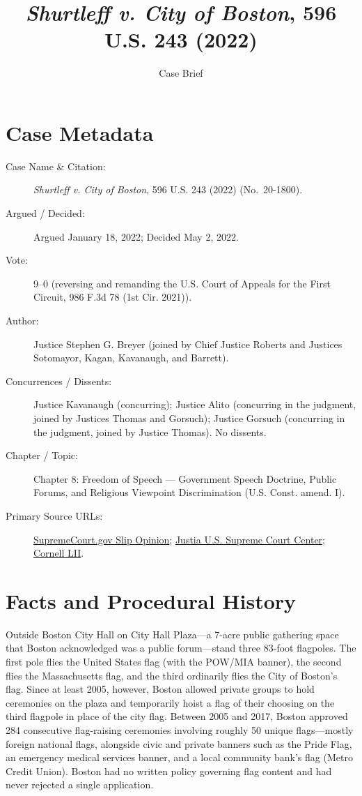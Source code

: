 \documentclass[12pt]{article}
\title{\textit{Shurtleff v. City of Boston}, 596 U.S. 243 (2022)}
\author{Case Brief}
\date{}
\begin{document}
\maketitle

\section{Case Metadata}
\begin{description}
  \item[Case Name \& Citation:] \textit{Shurtleff v. City of Boston}, 596 U.S. 243 (2022) (No.~20-1800).
  \item[Argued / Decided:] Argued January 18, 2022; Decided May 2, 2022.
  \item[Vote:] 9--0 (reversing and remanding the U.S. Court of Appeals for the First Circuit, 986 F.3d 78 (1st Cir. 2021)).
  \item[Author:] Justice Stephen G. Breyer (joined by Chief Justice Roberts and Justices Sotomayor, Kagan, Kavanaugh, and Barrett).
  \item[Concurrences / Dissents:] Justice Kavanaugh (concurring); Justice Alito (concurring in the judgment, joined by Justices Thomas and Gorsuch); Justice Gorsuch (concurring in the judgment, joined by Justice Thomas). No dissents.
  \item[Chapter / Topic:] Chapter 8: Freedom of Speech --- Government Speech Doctrine, Public Forums, and Religious Viewpoint Discrimination (U.S. Const. amend. I).
  \item[Primary Source URLs:] \href{https://www.supremecourt.gov/opinions/21pdf/20-1800_7lho.pdf}{SupremeCourt.gov Slip Opinion}; \href{https://supreme.justia.com/cases/federal/us/596/20-1800/}{Justia U.S. Supreme Court Center}; \href{https://www.law.cornell.edu/supremecourt/text/20-1800}{Cornell LII}.
\end{description}

\section{Facts and Procedural History}
Outside Boston City Hall on City Hall Plaza---a 7-acre public gathering space that Boston acknowledged was a public forum---stand three 83-foot flagpoles. The first pole flies the United States flag (with the POW/MIA banner), the second flies the Massachusetts flag, and the third ordinarily flies the City of Boston's flag. Since at least 2005, however, Boston allowed private groups to hold ceremonies on the plaza and temporarily hoist a flag of their choosing on the third flagpole in place of the city flag. Between 2005 and 2017, Boston approved 284 consecutive flag-raising ceremonies involving roughly 50 unique flags---mostly foreign national flags, alongside civic and private banners such as the Pride Flag, an emergency medical services banner, and a local community bank's flag (Metro Credit Union). Boston had no written policy governing flag content and had never rejected a single application.
\end{document}
